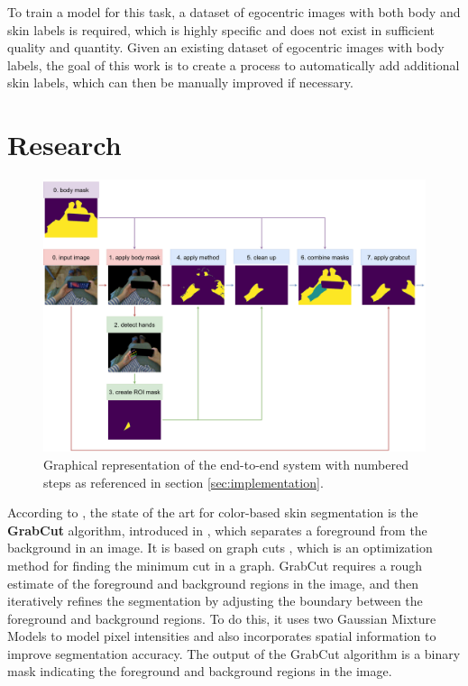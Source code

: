 \documentclass[conference]{IEEEtran}
\begin{document}
To train a model for this task, a dataset of egocentric images with both body and skin labels is required, which is highly specific and does not exist in sufficient quality and quantity. Given an existing dataset of egocentric images with body labels, the goal of this work is to create a process to automatically add additional skin labels, which can then be manually improved if necessary.

\section{Research}

\begin{figure}[h]
	\includegraphics[width=\textwidth]{images/pipeline.png}
	\caption{Graphical representation of the end-to-end system with numbered steps as referenced in section \ref{sec:implementation}.}
	\label{fig:end-to-end system}
\end{figure}

According to \cite{b2}, the state of the art for color-based skin segmentation is the \textbf{GrabCut} algorithm, introduced in \cite{b3}, which separates a foreground from the background in an image. It is based on graph cuts \cite{b4}, which is an optimization method for finding the minimum cut in a graph. GrabCut requires a rough estimate of the foreground and background regions in the image, and then iteratively refines the segmentation by adjusting the boundary between the foreground and background regions. To do this, it uses two Gaussian Mixture Models to model pixel intensities and also incorporates spatial information to improve segmentation accuracy. The output of the GrabCut algorithm is a binary mask indicating the foreground and background regions in the image. \\
\end{document}
